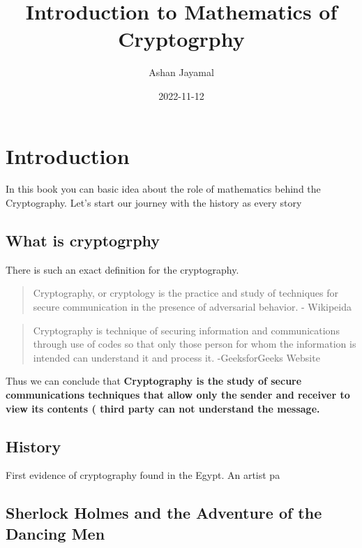 \documentclass[
]{book}
\title{Introduction to Mathematics of Cryptogrphy}
\author{Ashan Jayamal}
\date{2022-11-12}
\begin{document}
\maketitle

{
\setcounter{tocdepth}{1}
\tableofcontents
}
\hypertarget{introduction}{%
\chapter{Introduction}\label{introduction}}

In this book you can basic idea about the role of mathematics behind the Cryptography. Let's start our journey with the history as every story

\hypertarget{what-is-cryptogrphy}{%
\section{What is cryptogrphy}\label{what-is-cryptogrphy}}

There is such an exact definition for the cryptography.

\begin{quote}
Cryptography, or cryptology is the practice and study of techniques for secure communication in the presence of adversarial behavior.
- Wikipeida
\end{quote}

\begin{quote}
Cryptography is technique of securing information and communications through use of codes so that only those person for whom the information is intended can understand it and process it.
-GeeksforGeeks Website
\end{quote}

Thus we can conclude that \textbf{Cryptography is the study of secure communications techniques that allow only the sender and receiver to view its contents ( third party can not understand the message.}

\hypertarget{history}{%
\section{History}\label{history}}

First evidence of cryptography found in the Egypt. An artist pa

\hypertarget{sherlock-holmes-and-the-adventure-of-the-dancing-men}{%
\section{Sherlock Holmes and the Adventure of the Dancing Men}\label{sherlock-holmes-and-the-adventure-of-the-dancing-men}}
\end{document}
